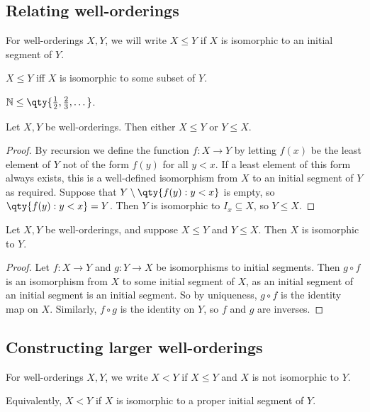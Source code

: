 \subsection{Relating well-orderings}
\begin{definition}
    For well-orderings $X, Y$, we will write $X \leq Y$ if $X$ is isomorphic to an initial segment of $Y$.
\end{definition}
$X \leq Y$ iff $X$ is isomorphic to some subset of $Y$.
\begin{example}
    $\mathbb N \leq \qty{\frac{1}{2}, \frac{2}{3}, \dots}$.
\end{example}
\begin{proposition}
    Let $X, Y$ be well-orderings.
    Then either $X \leq Y$ or $Y \leq X$.
\end{proposition}
\begin{proof}
    By recursion we define the function $f \colon X \to Y$ by letting $f(x)$ be the least element of $Y$ not of the form $f(y)$ for all $y < x$.
    If a least element of this form always exists, this is a well-defined isomorphism from $X$ to an initial segment of $Y$ as required.
    Suppose that $Y \setminus \qty{f(y) : y < x}$ is empty, so $\qty{f(y) : y < x} = Y$.
    Then $Y$ is isomorphic to $I_x \subseteq X$, so $Y \leq X$.
\end{proof}
\begin{proposition}
    Let $X, Y$ be well-orderings, and suppose $X \leq Y$ and $Y \leq X$.
    Then $X$ is isomorphic to $Y$.
\end{proposition}
\begin{proof}
    Let $f \colon X \to Y$ and $g \colon Y \to X$ be isomorphisms to initial segments.
    Then $g \circ f$ is an isomorphism from $X$ to some initial segment of $X$, as an initial segment of an initial segment is an initial segment.
    So by uniqueness, $g \circ f$ is the identity map on $X$.
    Similarly, $f \circ g$ is the identity on $Y$, so $f$ and $g$ are inverses.
\end{proof}

\subsection{Constructing larger well-orderings}
\begin{definition}
    For well-orderings $X, Y$, we write $X < Y$ if $X \leq Y$ and $X$ is not isomorphic to $Y$.
\end{definition}
Equivalently, $X < Y$ if $X$ is isomorphic to a proper initial segment of $Y$.

